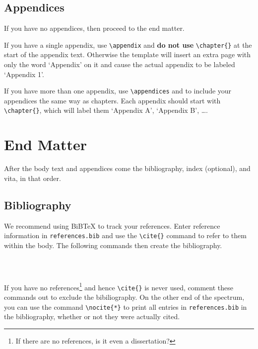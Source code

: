 \subsection{Appendices} %
%

If you have no appendices, then proceed to the end matter.

If you have a single appendix, use \verb+\appendix+ and \textbf{do not use}
\verb+\chapter{}+ at the start of the appendix text.
Otherwise the template will insert an extra page with only the word
`Appendix' on it and cause the actual appendix to be labeled `Appendix 1'.

If you have more than one appendix, use \verb+\appendices+
and \verb++ to include your appendices the same way as chapters.
Each appendix should start with \verb+\chapter{}+, which will label them `Appendix A', `Appendix B', \ldots.

\section{End Matter} %

After the body text and appendices come the bibliography, index (optional), and vita, in that order.

\subsection{Bibliography} %
\label{section:bibliography}

We recommend using BiB\TeX{} to track your references.
%
Enter reference information in \texttt{references.bib} and use the \verb+\cite{}+ command to refer to them within the body.
The following commands then create the bibliography.
\begin{verbatim}
    
    
\end{verbatim}
If you have no references\footnote{If there are no references, is it even a dissertation?} and hence \verb+\cite{}+ is never used, comment these commands out to exclude the bibiliography.
On the other end of the spectrum, you can use the command \verb+\nocite{*}+ to print all entries in \texttt{references.bib} in the bibliography, whether or not they were actually cited.

